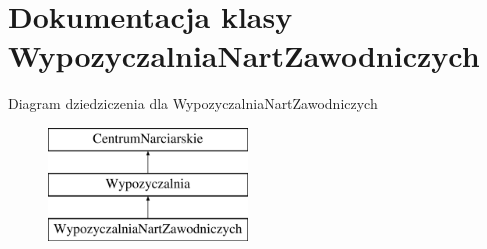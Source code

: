 \hypertarget{class_wypozyczalnia_nart_zawodniczych}{}\section{Dokumentacja klasy Wypozyczalnia\+Nart\+Zawodniczych}
\label{class_wypozyczalnia_nart_zawodniczych}
Diagram dziedziczenia dla Wypozyczalnia\+Nart\+Zawodniczych\begin{figure}[H]
\begin{center}
\leavevmode
\includegraphics[height=3.000000cm]{class_wypozyczalnia_nart_zawodniczych}
\end{center}
\end{figure}
